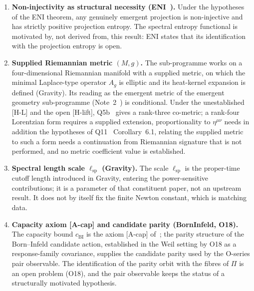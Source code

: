 \documentclass[11pt,a4paper]{article}
\theoremstyle{definition}
\newcommand{\lsp}{\ell_{\mathrm{sp}}}
\newcommand{\cBI}{c_{\mathrm{BI}}}
\begin{document}
    \begin{enumerate}
      \item \textbf{Non-injectivity as structural necessity (ENI~\cite{Beau2026l}).}
      Under the hypotheses of the ENI theorem, any genuinely emergent projection is non-injective and has strictly
      positive projection entropy.
      The spectral entropy functional is motivated by, not derived from, this result: ENI states that its
      identification with the projection entropy is open.

      \item \textbf{Supplied Riemannian metric $(M, g)$.}
      The sub-programme works on a four-dimensional Riemannian manifold with a supplied metric, on which the
      minimal Laplace-type operator $A_g$ is elliptic and its heat-kernel expansion is defined (Gravity).
      Its reading as the emergent metric of the emergent geometry sub-programme (Note~2~\cite{Beau2026egnote})
      is conditional.
      Under the unestablished [H-L] and the open [H-lift], Q5b~\cite{Beau2026q5b} gives a rank-three co-metric; a
      rank-four Lorentzian form requires a supplied extension, proportionality to $\eta^{\mu\nu}$ needs in addition
      the hypotheses of Q11~\cite{Beau2026q11} Corollary~6.1, relating the supplied metric to such a form needs a
      continuation from Riemannian signature that is not performed, and no metric coefficient value is established.

      \item \textbf{Spectral length scale $\lsp$ (Gravity).}
      The scale $\lsp$ is the proper-time cutoff length introduced in Gravity, entering the power-sensitive
      contributions; it is a parameter of that constituent paper, not an upstream result.
      It does not by itself fix the finite Newton constant, which is matching data.

      \item \textbf{Capacity axiom [A-cap] and candidate parity (BornInfeld, O18).}
      The capacity bound $\cBI$ is the axiom [A-cap] of~\cite{Beau2026c}; the parity
      structure of the Born--Infeld candidate action, established in the Weil setting by
      O18 as a response-family covariance, supplies the candidate parity used by the
      O-series pair observable.
      The identification of the parity orbit with the fibres of $\Pi$ is an open problem
      (O18), and the pair observable keeps the status of a structurally motivated
      hypothesis.
    \end{enumerate}
\end{document}
